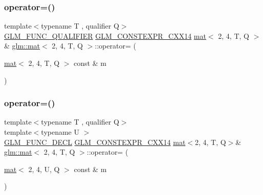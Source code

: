\subsubsection{\texorpdfstring{operator=()}{operator=()}\hspace{0.1cm}{\footnotesize\ttfamily [1/3]}}
{\footnotesize\ttfamily template$<$typename T , qualifier Q$>$ \\
\mbox{\hyperlink{setup_8hpp_a33fdea6f91c5f834105f7415e2a64407}{G\+L\+M\+\_\+\+F\+U\+N\+C\+\_\+\+Q\+U\+A\+L\+I\+F\+I\+ER}} \mbox{\hyperlink{setup_8hpp_a4dd12abf5e1164bc57f3a34671d03844}{G\+L\+M\+\_\+\+C\+O\+N\+S\+T\+E\+X\+P\+R\+\_\+\+C\+X\+X14}} \mbox{\hyperlink{structglm_1_1mat}{mat}}$<$ 2, 4, T, Q $>$ \& \mbox{\hyperlink{structglm_1_1mat}{glm\+::mat}}$<$ 2, 4, T, Q $>$\+::operator= (\begin{DoxyParamCaption}\item[{\mbox{\hyperlink{structglm_1_1mat}{mat}}$<$ 2, 4, T, Q $>$ const \&}]{m }\end{DoxyParamCaption})}

\mbox{\label{structglm_1_1mat_3_012_00_014_00_01_t_00_01_q_01_4_ae87ff600b214915268b087c314e3cdf8}} 
\subsubsection{\texorpdfstring{operator=()}{operator=()}\hspace{0.1cm}{\footnotesize\ttfamily [2/3]}}
{\footnotesize\ttfamily template$<$typename T , qualifier Q$>$ \\
template$<$typename U $>$ \\
\mbox{\hyperlink{setup_8hpp_ab2d052de21a70539923e9bcbf6e83a51}{G\+L\+M\+\_\+\+F\+U\+N\+C\+\_\+\+D\+E\+CL}} \mbox{\hyperlink{setup_8hpp_a4dd12abf5e1164bc57f3a34671d03844}{G\+L\+M\+\_\+\+C\+O\+N\+S\+T\+E\+X\+P\+R\+\_\+\+C\+X\+X14}} \mbox{\hyperlink{structglm_1_1mat}{mat}}$<$2, 4, T, Q$>$\& \mbox{\hyperlink{structglm_1_1mat}{glm\+::mat}}$<$ 2, 4, T, Q $>$\+::operator= (\begin{DoxyParamCaption}\item[{\mbox{\hyperlink{structglm_1_1mat}{mat}}$<$ 2, 4, U, Q $>$ const \&}]{m }\end{DoxyParamCaption})}

